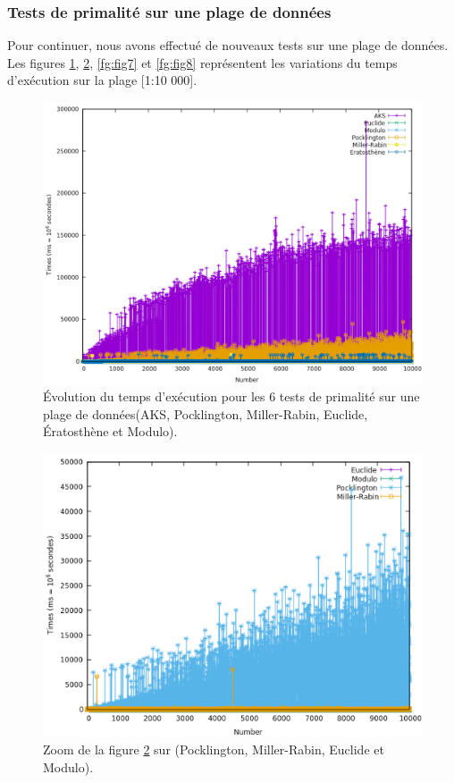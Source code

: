 	\subsubsection{Tests de primalité sur une plage de données}
Pour continuer, nous avons effectué de nouveaux tests sur une plage de données. Les figures \ref{fg:fig5}, \ref{fg:fig6}, \ref{fg:fig7} et \ref{fg:fig8} représentent les variations du temps d'exécution sur la plage [1:10 000].
\begin{figure}[!ht]
		\begin{center}\includegraphics[scale=0.5]{RANGE.png}\end{center}
		\caption{Évolution du temps d'exécution pour les 6 tests de primalité sur une plage de données(AKS, Pocklington, Miller-Rabin, Euclide, Ératosthène et Modulo). }
		\label{fg:fig5}
\end{figure}
\begin{figure}[!ht]
		\begin{center}\includegraphics[scale=0.5]{RZoom1.png}\end{center}
		\caption{Zoom de la figure \ref{fg:fig6} sur (Pocklington, Miller-Rabin, Euclide et Modulo).}
		\label{fg:fig6}
\end{figure}
